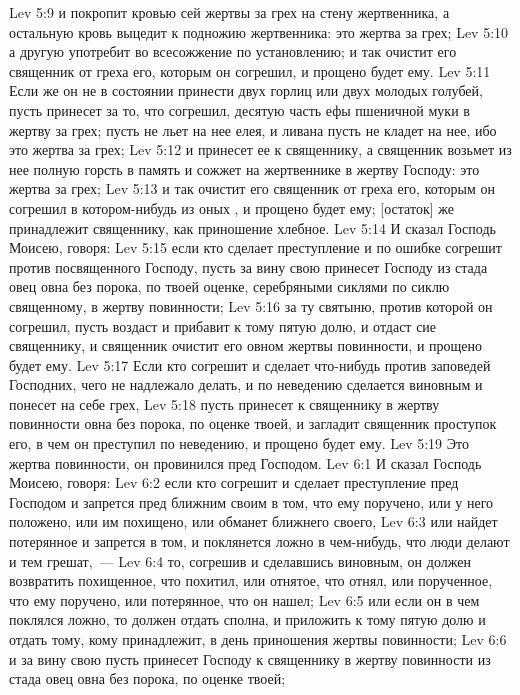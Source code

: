 \vs Lev 5:9 и покропит кровью сей жертвы за грех на стену жертвенника, а остальную кровь выцедит к подножию жертвенника: это жертва за грех;
\vs Lev 5:10 а другую употребит во всесожжение по установлению; и так очистит его священник от греха его, которым он согрешил, и прощено будет ему.
\vs Lev 5:11 Если же он не в состоянии принести двух горлиц или двух молодых голубей, пусть принесет за то, что согрешил, десятую часть ефы пшеничной муки в жертву за грех; пусть не льет на нее елея, и ливана пусть не кладет на нее, ибо это жертва за грех;
\vs Lev 5:12 и принесет ее к священнику, а священник возьмет из нее полную горсть в память и сожжет на жертвеннике в жертву Господу: это жертва за грех;
\vs Lev 5:13 и так очистит его священник от греха его, которым он согрешил в котором-нибудь из оных , и прощено будет ему; [остаток] же принадлежит священнику, как приношение хлебное.
\rsbpar\vs Lev 5:14 И сказал Господь Моисею, говоря:
\vs Lev 5:15 если кто сделает преступление и по ошибке согрешит против посвященного Господу, пусть за вину свою принесет Господу из стада овец овна без порока, по твоей оценке, серебряными сиклями по сиклю священному, в жертву повинности;
\vs Lev 5:16 за ту святыню, против которой он согрешил, пусть воздаст и прибавит к тому пятую долю, и отдаст сие священнику, и священник очистит его овном жертвы повинности, и прощено будет ему.
\vs Lev 5:17 Если кто согрешит и сделает что-нибудь против заповедей Господних, чего не надлежало делать, и по неведению сделается виновным и понесет на себе грех,
\vs Lev 5:18 пусть принесет к священнику в жертву повинности овна без порока, по оценке твоей, и загладит священник проступок его, в чем он преступил по неведению, и прощено будет ему.
\vs Lev 5:19 Это жертва повинности,  он провинился пред Господом.
\vs Lev 6:1 И сказал Господь Моисею, говоря:
\vs Lev 6:2 если кто согрешит и сделает преступление пред Господом и запрется пред ближним своим в том, что ему поручено, или у него положено, или им похищено, или обманет ближнего своего,
\vs Lev 6:3 или найдет потерянное и запрется в том, и поклянется ложно в чем-нибудь, что люди делают и тем грешат,~---
\vs Lev 6:4 то, согрешив и сделавшись виновным, он должен возвратить похищенное, что похитил, или отнятое, что отнял, или порученное, что ему поручено, или потерянное, что он нашел;
\vs Lev 6:5 или если он в чем поклялся ложно, то должен отдать сполна, и приложить к тому пятую долю и отдать тому, кому принадлежит, в день приношения жертвы повинности;
\vs Lev 6:6 и за вину свою пусть принесет Господу к священнику в жертву повинности из стада овец овна без порока, по оценке твоей;

